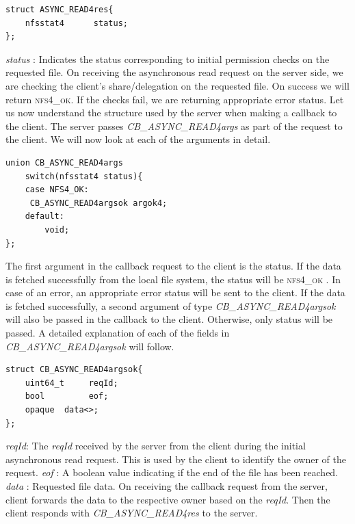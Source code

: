 \begin{lstlisting}
struct ASYNC_READ4res{
	nfsstat4	  status;
};
\end{lstlisting}
\textit{status} : Indicates the status corresponding to initial permission checks on the requested file.
On receiving the asynchronous read request on the server side, we are checking the client's share/delegation on the requested file. On success we will return \textsc{nfs4\_ok}.  If the checks fail, we are returning appropriate error status.
\hfill \break \newline
\noindent Let us now understand the structure used by the server when making a callback to the client. The server passes \textit{CB\_ASYNC\_READ4args} as part of the request to the client. We will now look at each of the arguments in detail. 
\begin{lstlisting}
union CB_ASYNC_READ4args 
	switch(nfsstat4 status){
	case NFS4_OK:
	 CB_ASYNC_READ4argsok argok4;
 	default:
		void;
};
\end{lstlisting}

\noindent The first argument in the callback request to the client is the status. If the data is fetched successfully from the local file system, the status will be \textsc{nfs4\_ok} . In case of an error, an appropriate error status will be sent to the client. If the data is fetched successfully, a second argument of type \textit{CB\_ASYNC\_READ4argsok} will also be passed in the callback to the client. Otherwise, only status will be passed. A detailed explanation of each of the fields in \textit{CB\_ASYNC\_READ4argsok} will follow.

\begin{lstlisting}
struct CB_ASYNC_READ4argsok{
	uint64_t	 reqId;
	bool		 eof;
	opaque	data<>;
};
\end{lstlisting}

\noindent\textit{reqId}: The \textit{reqId} received by the server from the client during the initial asynchronous read request. This is used by the client to identify the owner of the request.
\hfill \break \newline
\noindent\textit{eof} : A boolean value indicating if the end of the file has been reached.
\hfill \break \newline
\noindent\textit{data} : Requested file data.
\hfill \break \newline
\noindent On receiving the callback request from the server, client forwards the data to the respective owner based on the \textit{reqId}. Then the client responds with \textit{CB\_ASYNC\_READ4res} to the server.
 
